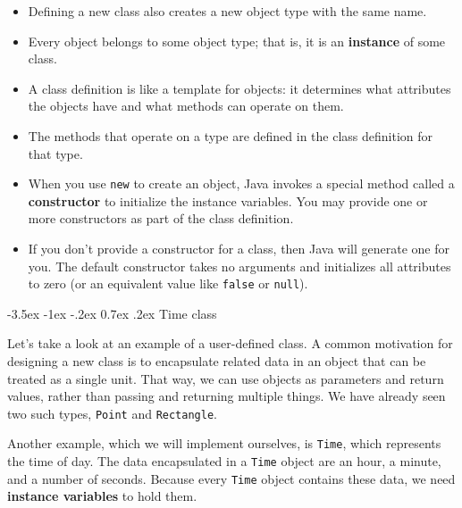 \documentclass[12pt]{book}
\makeatletter
\theoremstyle{exercise}
\newcommand{\java}[1]{\verb"#1"}
\renewcommand{\section}{\@startsection {section}{1}{\z@}%
    {-3.5ex \@plus -1ex \@minus -.2ex}%
    {0.7ex \@plus.2ex}%
    {\normalfont\Large\bfseries}}
\newcommand{\java}[1]{\lstinline{#1}} %
\makeatother
\begin{document}
\begin{itemize}

\item Defining a new class also creates a new object type with the same name.


\item Every object belongs to some object type; that is, it is an {\bf instance} of some class.

\item A class definition is like a template for objects: it determines what attributes the objects have and what methods can operate on them.

\item The methods that operate on a type are defined in the class definition for that type.


\item When you use \java{new} to create an object, Java invokes a special method called a {\bf constructor} to initialize the instance variables.
You may provide one or more constructors as part of the class definition.

\item If you don't provide a constructor for a class, then Java will generate one for you.
The default constructor takes no arguments and initializes all attributes to zero (or an equivalent value like \java{false} or \java{null}).

\end{itemize}


\section{Time class}


Let's take a look at an example of a user-defined class.
A common motivation for designing a new class is to encapsulate related data in an object that can be treated as a single unit.
That way, we can use objects as parameters and return values, rather than passing and returning multiple things.
We have already seen two such types, \java{Point} and \java{Rectangle}.


Another example, which we will implement ourselves, is \java{Time}, which represents the time of day.
The data encapsulated in a \java{Time} object are an hour, a minute, and a number of seconds.
Because every \java{Time} object contains these data, we need {\bf instance variables} to hold them.
\end{document}
